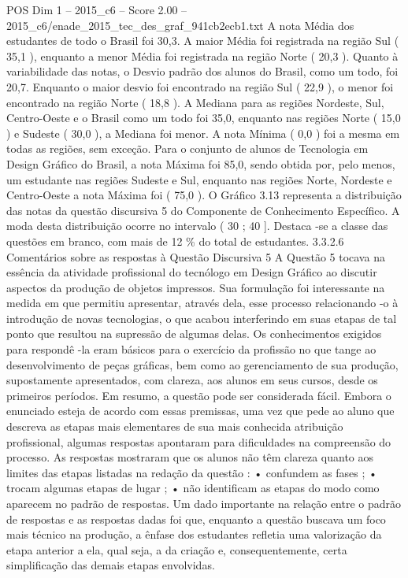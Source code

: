 \begin{textsample}{POS Dim 1 – 2015\_c6 – Score 2.00 – 2015\_c6/enade\_2015\_tec\_des\_graf\_941cb2ecb1.txt}
A nota Média dos estudantes de todo o Brasil foi 30,3.
A maior Média foi registrada na região Sul ( 35,1 ), enquanto a menor Média foi registrada na região Norte ( 20,3 ).
Quanto à variabilidade das notas, o Desvio padrão dos alunos do Brasil, como um todo, foi 20,7.
Enquanto o maior desvio foi encontrado na região Sul ( 22,9 ), o menor foi encontrado na região Norte ( 18,8 ).
A Mediana para as regiões Nordeste, Sul, Centro-Oeste e o Brasil como um todo foi 35,0, enquanto nas regiões Norte ( 15,0 ) e Sudeste ( 30,0 ), a Mediana foi menor.
A nota Mínima ( 0,0 ) foi a mesma em todas as regiões, sem exceção.
Para o conjunto de alunos de Tecnologia em Design Gráfico do Brasil, a nota Máxima foi 85,0, sendo obtida por, pelo menos, um estudante nas regiões Sudeste e Sul, enquanto nas regiões Norte, Nordeste e Centro-Oeste a nota Máxima foi ( 75,0 ).
O Gráfico 3.13 representa a distribuição das notas da questão discursiva 5 do Componente de Conhecimento Específico.
A moda desta distribuição ocorre no intervalo ( 30 ; 40 ].
Destaca -se a classe das questões em branco, com mais de 12 \% do total de estudantes. 3.3.2.6 Comentários sobre as respostas à Questão Discursiva 5 A Questão 5 tocava na essência da atividade profissional do tecnólogo em Design Gráfico ao discutir aspectos da produção de objetos impressos.
Sua formulação foi interessante na medida em que permitiu apresentar, através dela, esse processo relacionando -o à introdução de novas tecnologias, o que acabou interferindo em suas etapas de tal ponto que resultou na supressão de algumas delas.
Os conhecimentos exigidos para respondê -la eram básicos para o exercício da profissão no que tange ao desenvolvimento de peças gráficas, bem como ao gerenciamento de sua produção, supostamente apresentados, com clareza, aos alunos em seus cursos, desde os primeiros períodos.
Em resumo, a questão pode ser considerada fácil.
Embora o enunciado esteja de acordo com essas premissas, uma vez que pede ao aluno que descreva as etapas mais elementares de sua mais conhecida atribuição profissional, algumas respostas apontaram para dificuldades na compreensão do processo.
As respostas mostraram que os alunos não têm clareza quanto aos limites das etapas listadas na redação da questão : • confundem as fases ; • trocam algumas etapas de lugar ; • não identificam as etapas do modo como aparecem no padrão de respostas.
Um dado importante na relação entre o padrão de respostas e as respostas dadas foi que, enquanto a questão buscava um foco mais técnico na produção, a ênfase dos estudantes refletia uma valorização da etapa anterior a ela, qual seja, a da criação e, consequentemente, certa simplificação das demais etapas envolvidas.

\end{textsample}
